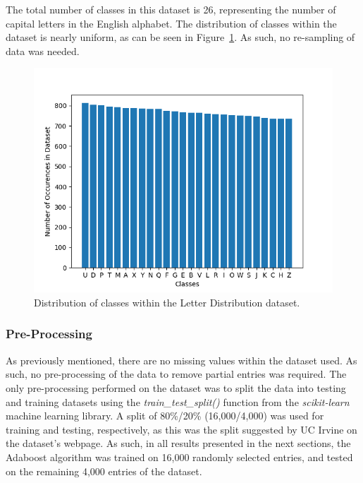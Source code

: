 \documentclass[a4paper]{article}
\begin{document}
The total number of classes in this dataset is 26, representing the number of capital letters in the English alphabet. The distribution of classes within the dataset is nearly uniform, as can be seen in Figure~\ref{fig:class-histogram}. As such, no re-sampling of data was needed.

\begin{figure}[h!]
    \centering
    \includegraphics[scale=0.55]{images/class-distribution.png}
    \caption{Distribution of classes within the Letter Distribution dataset.}
    \label{fig:class-histogram}
\end{figure}

\subsubsection{Pre-Processing}
As previously mentioned, there are no missing values within the dataset used. As such, no pre-processing of the data to remove partial entries was required. The only pre-processing performed on the dataset was to split the data into testing and training datasets using the \textit{train\_test\_split()} function from the \textit{scikit-learn} machine learning library. A split of 80\%/20\% (16,000/4,000) was used for training and testing, respectively, as this was the split suggested by UC Irvine on the dataset's webpage. As such, in all results presented in the next sections, the Adaboost algorithm was trained on 16,000 randomly selected entries, and tested on the remaining 4,000 entries of the dataset.
\end{document}
